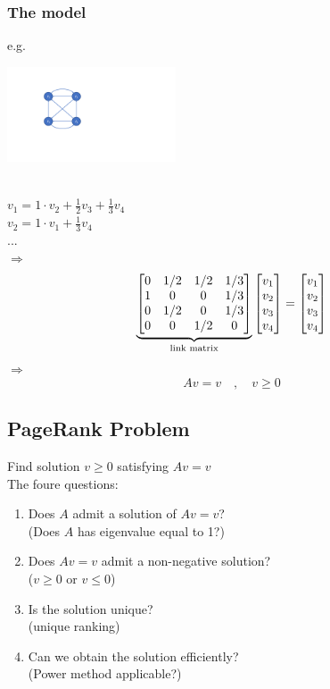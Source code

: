 \begin{multicols}{2}
\subsubsection{The model}
e.g. \\
\centerline{\includegraphics[width=5cm]{sections/lecture_5_fig1.pdf}} \\
$v_1 = 1\cdot v_2 + \frac{1}{2}v_3 + \frac{1}{3}v_4$ \\
$v_2 = 1\cdot v_1 + \frac{1}{3}v_4$ \\
... \\
$\Longrightarrow$
\[
    \underbrace{
    \begin{bmatrix}
        0  &  1/2  &  1/2  &  1/3  \\
        1  &  0    &  0    &  1/3  \\
        0  &  1/2  &  0    &  1/3  \\
        0  &  0    &  1/2  &  0    \\
    \end{bmatrix}
    }_{\text{\rm link matrix}}
    \begin{bmatrix}
        v_1 \\ v_2 \\ v_3 \\ v_4
    \end{bmatrix}
    =
    \begin{bmatrix}
        v_1 \\ v_2 \\ v_3 \\ v_4
    \end{bmatrix}
\]
$\Longrightarrow$
\[
    Av = v\quad ,\quad v \geq 0
\]

\subsection{PageRank Problem}
Find solution $v\geq 0$ satisfying $Av=v$ \\
The foure questions:
\begin{enumerate}
    \item Does $A$ admit a solution of $Av=v$?          \\ (Does $A$ has eigenvalue equal to 1?)
    \item Does $Av=v$ admit a non-negative solution?    \\ ($v\geq 0$ or $v\leq 0$)
    \item Is the solution unique?                       \\ (unique ranking)
    \item Can we obtain the solution efficiently?       \\ (Power method applicable?)
\end{enumerate}


\end{multicols}
